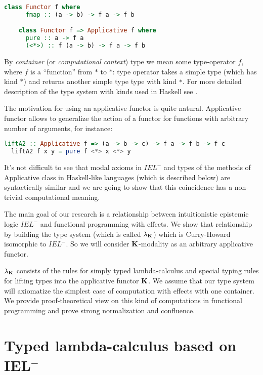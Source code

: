 \documentclass[a4paper]{article}
\begin{document}
  \begin{lstlisting}[language=Haskell]
    class Functor f where
      fmap :: (a -> b) -> f a -> f b

    class Functor f => Applicative f where
      pure :: a -> f a
      (<*>) :: f (a -> b) -> f a -> f b
  \end{lstlisting}

  By \emph{container} (or \emph{computational context}) type we mean some type-operator $f$, where $f$ is a
  ``function'' from $*$ to $*$: type operator takes a simple type (which has kind $*$) and returns another
  simple type type with kind \verb"*". For more detailed description of the type system with kinds used in
  Haskell see \cite{Morten}.

  The motivation for using an applicative functor is quite natural. Applicative functor allows to generalize the action of a functor for functions with arbitrary number of arguments, for instance:
  \begin{lstlisting}[language=Haskell]
  liftA2 :: Applicative f => (a -> b -> c) -> f a -> f b -> f c
  liftA2 f x y = pure f <*> x <*> y
  \end{lstlisting}

  It's not difficult to see that modal axioms in $IEL^{-}$ and types of the methods of Applicative class in
  Haskell-like languages (which is described below) are syntactically similar and we are going to show that
  this coincidence has a non-trivial computational meaning.

  The main goal of our research is a relationship between intuitionistic epistemic logic $IEL^{-}$ and
  functional programming with effects. We show that relationship by building the type system (which is called $\lambda_{{\bf K}}$) which is Curry-Howard isomorphic to $IEL^{-}$. So we will consider ${\bf K}$-modality as an arbitrary applicative functor.

  $\lambda_{{\bf K}}$ consists of the rules for simply typed lambda-calculus and special typing rules for
  lifting types into the applicative functor ${\bf K}$. We assume that our type system will
  axiomatize the simplest case of computation with effects with one container. We provide proof-theoretical
  view on
  this kind of computations in functional programming and prove strong normalization and confluence.

  \section{Typed lambda-calculus based on IEL$^{-}$}
\end{document}
